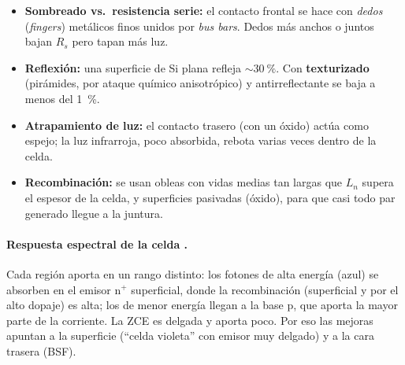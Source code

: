 \begin{itemize}
  \item \textbf{Sombreado vs.\ resistencia serie:} el contacto frontal se hace con
  \emph{dedos} (\emph{fingers}) metálicos finos unidos por \emph{bus bars}. Dedos más
  anchos o juntos bajan $R_s$ pero tapan más luz.
  \item \textbf{Reflexión:} una superficie de Si plana refleja $\sim\SI{30}{\percent}$. Con
  \textbf{texturizado} (pirámides, por ataque químico anisotrópico) y antirreflectante se
  baja a menos del \SI{1}{\percent}.
  \item \textbf{Atrapamiento de luz:} el contacto trasero (con un óxido) actúa como espejo;
  la luz infrarroja, poco absorbida, rebota varias veces dentro de la celda.
  \item \textbf{Recombinación:} se usan obleas con vidas medias tan largas que $L_n$ supera
  el espesor de la celda, y superficies pasivadas (óxido), para que casi todo par
  generado llegue a la juntura.
\end{itemize}

\paragraph{Respuesta espectral de la celda .} Cada región aporta en un rango
distinto: los fotones de alta energía (azul) se absorben en el emisor n$^+$ superficial,
donde la recombinación (superficial y por el alto dopaje) es alta; los de menor energía
llegan a la base p, que aporta la mayor parte de la corriente. La ZCE es delgada y aporta
poco. Por eso las mejoras apuntan a la superficie (``celda violeta'' con emisor muy
delgado) y a la cara trasera (BSF).

